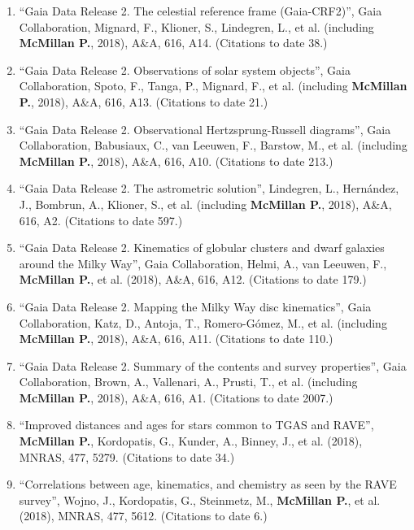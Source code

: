 \documentclass{resume}
\begin{document}
\begin{enumerate}
\item ``Gaia Data Release 2. The celestial reference frame (Gaia-CRF2)'', Gaia Collaboration, Mignard, F., Klioner, S., Lindegren, L., et al. (including \textbf{McMillan P.}, 2018), A\&A, 616, A14. (Citations to date 38.)

\item ``Gaia Data Release 2. Observations of solar system objects'', Gaia Collaboration, Spoto, F., Tanga, P., Mignard, F., et al. (including \textbf{McMillan P.}, 2018), A\&A, 616, A13. (Citations to date 21.)

\item ``Gaia Data Release 2. Observational Hertzsprung-Russell diagrams'', Gaia Collaboration, Babusiaux, C., van Leeuwen, F., Barstow, M., et al. (including \textbf{McMillan P.}, 2018), A\&A, 616, A10. (Citations to date 213.)

\item ``Gaia Data Release 2. The astrometric solution'', Lindegren, L., Hern\'andez, J., Bombrun, A., Klioner, S., et al. (including \textbf{McMillan P.}, 2018), A\&A, 616, A2. (Citations to date 597.)

\item ``Gaia Data Release 2. Kinematics of globular clusters and dwarf galaxies around the Milky Way'', Gaia Collaboration, Helmi, A., van Leeuwen, F., \textbf{McMillan P.}, et al. (2018), A\&A, 616, A12. (Citations to date 179.)

\item ``Gaia Data Release 2. Mapping the Milky Way disc kinematics'', Gaia Collaboration, Katz, D., Antoja, T., Romero-G\'omez, M., et al. (including \textbf{McMillan P.}, 2018), A\&A, 616, A11. (Citations to date 110.)

\item ``Gaia Data Release 2. Summary of the contents and survey properties'', Gaia Collaboration, Brown, A., Vallenari, A., Prusti, T., et al. (including \textbf{McMillan P.}, 2018), A\&A, 616, A1. (Citations to date 2007.)

\item ``Improved distances and ages for stars common to TGAS and RAVE'', \textbf{McMillan P.}, Kordopatis, G., Kunder, A., Binney, J., et al. (2018), MNRAS, 477, 5279. (Citations to date 34.)

\item ``Correlations between age, kinematics, and chemistry as seen by the RAVE survey'', Wojno, J., Kordopatis, G., Steinmetz, M., \textbf{McMillan P.}, et al. (2018), MNRAS, 477, 5612. (Citations to date 6.)


\end{enumerate}
\end{document}
